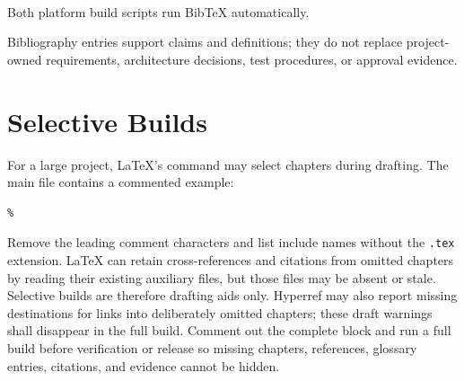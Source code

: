 \begin{verbatim}


\end{verbatim}

Both platform build scripts run BibTeX automatically.

Bibliography entries support claims and definitions; they do not replace
project-owned requirements, architecture decisions, test procedures, or
approval evidence.

\section{Selective Builds}

For a large project, LaTeX's \verb|| command may select chapters
during drafting. The main file contains a commented example:

\begin{verbatim}
% 
\end{verbatim}

Remove the leading comment characters and list include names without the
\texttt{.tex} extension. LaTeX can retain cross-references and citations from
omitted chapters by reading their existing auxiliary files, but those files
may be absent or stale. Selective builds are therefore drafting aids only.
Hyperref may also report missing destinations for links into deliberately
omitted chapters; these draft warnings shall disappear in the full build.
Comment out the complete \verb|| block and run a full build before
verification or release so missing chapters, references, glossary entries,
citations, and evidence cannot be hidden.
